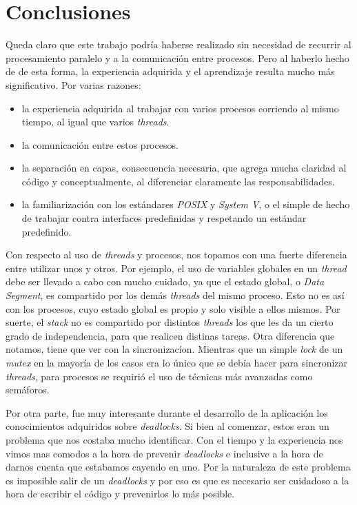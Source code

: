 \documentclass[a4paper,10pt]{article}
\begin{document}
\newpage
\section{Conclusiones}

Queda claro que este trabajo podría haberse realizado sin necesidad de recurrir al procesamiento paralelo y a la comunicación entre procesos. Pero al haberlo 
hecho de de esta forma, la experiencia adquirida y el aprendizaje resulta mucho más significativo. Por varias razones:

\begin{itemize}
\item la experiencia adquirida al trabajar con varios procesos corriendo al mismo tiempo, al igual que varios \textit{threads}.
\item la comunicación entre estos procesos.
\item la separación en capas, consecuencia necesaria, que agrega mucha claridad al código y conceptualmente, al diferenciar claramente las responsabilidades.
\item la familiarización con los estándares \textit{POSIX} y \textit{System V}, o el simple de hecho de trabajar contra interfaces predefinidas y respetando
      un estándar predefinido.
\end{itemize}

Con respecto al uso de \textit{threads}  y procesos, nos topamos con una fuerte diferencia entre utilizar unos y otros. Por ejemplo, el uso de variables globales 
en un \textit{thread} debe ser llevado a cabo con mucho cuidado, ya que el estado global, o \textit{Data Segment}, es compartido por los demás \textit{threads} 
del mismo proceso. Esto no es así con los procesos, cuyo estado global es propio y solo visible a ellos mismos. Por suerte, el \textit{stack} no es compartido 
por distintos \textit{threads} los que les da un cierto grado de independencia, para que realicen distinas tareas. Otra diferencia que notamos, tiene que ver 
con la sincronizacíon. Mientras que un simple \textit{lock} de un \textit{mutex} en la mayoría de los casos era lo único que se debía hacer para sincronizar 
\textit{threads}, para procesos se requirió el uso de técnicas más avanzadas como semáforos.

Por otra parte, fue muy interesante durante el desarrollo de la aplicación los conocimientos adquiridos sobre \textit{deadlocks}.
Si bien al comenzar, estos eran un problema que nos costaba mucho identificar. Con el tiempo y la experiencia nos vimos mas comodos
a la hora de prevenir \textit{deadlocks} e inclusive a la hora de darnos cuenta que estabamos cayendo en uno. Por la naturaleza de este
problema es imposible salir de un \textit{deadlocks} y por eso es que es necesario ser cuidadoso a la hora de escribir el
código y prevenirlos lo más posible.
\end{document}
